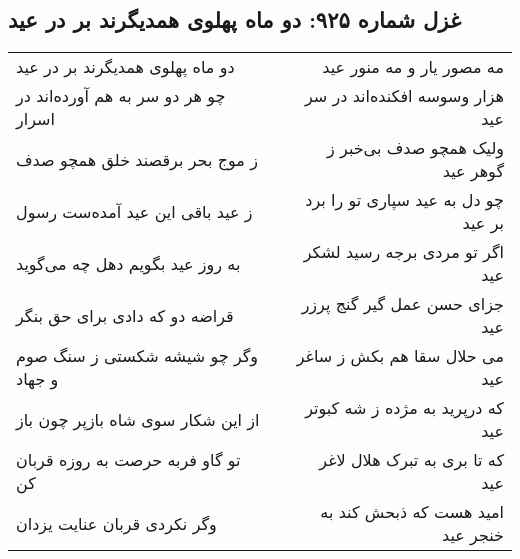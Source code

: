 \begin{center}
\section*{غزل شماره ۹۲۵: دو ماه پهلوی همدیگرند بر در عید}
\label{sec:0925}
\begin{longtable}{l p{0.5cm} r}
دو ماه پهلوی همدیگرند بر در عید
&&
مه مصور یار و مه منور عید
\\
چو هر دو سر به هم آورده‌اند در اسرار
&&
هزار وسوسه افکنده‌اند در سر عید
\\
ز موج بحر برقصند خلق همچو صدف
&&
ولیک همچو صدف بی‌خبر ز گوهر عید
\\
ز عید باقی این عید آمده‌ست رسول
&&
چو دل به عید سپاری تو را برد بر عید
\\
به روز عید بگویم دهل چه می‌گوید
&&
اگر تو مردی برجه رسید لشکر عید
\\
قراضه دو که دادی برای حق بنگر
&&
جزای حسن عمل گیر گنج پرزر عید
\\
وگر چو شیشه شکستی ز سنگ صوم و جهاد
&&
می حلال سقا هم بکش ز ساغر عید
\\
از این شکار سوی شاه بازپر چون باز
&&
که درپرید به مژده ز شه کبوتر عید
\\
تو گاو فربه حرصت به روزه قربان کن
&&
که تا بری به تبرک هلال لاغر عید
\\
وگر نکردی قربان عنایت یزدان
&&
امید هست که ذبحش کند به خنجر عید
\\
\end{longtable}
\end{center}
